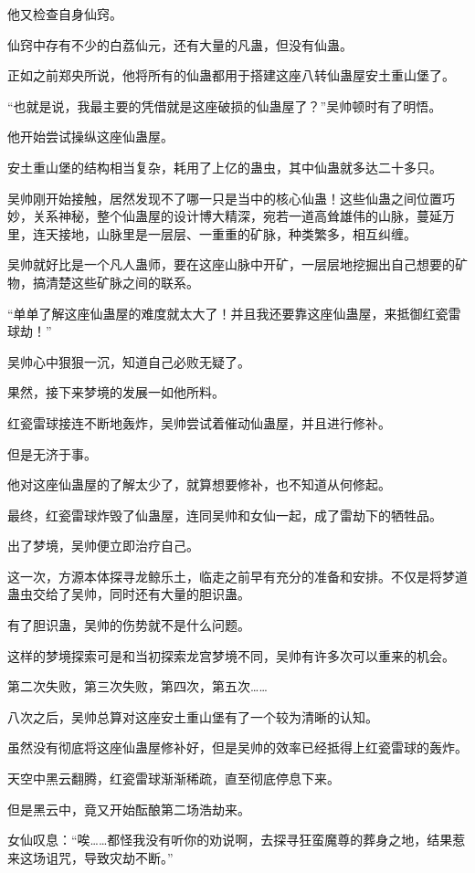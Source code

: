 \begin{this_body}
他又检查自身仙窍。

仙窍中存有不少的白荔仙元，还有大量的凡蛊，但没有仙蛊。

正如之前郑央所说，他将所有的仙蛊都用于搭建这座八转仙蛊屋安土重山堡了。

“也就是说，我最主要的凭借就是这座破损的仙蛊屋了？”吴帅顿时有了明悟。

他开始尝试操纵这座仙蛊屋。

安土重山堡的结构相当复杂，耗用了上亿的蛊虫，其中仙蛊就多达二十多只。

吴帅刚开始接触，居然发现不了哪一只是当中的核心仙蛊！这些仙蛊之间位置巧妙，关系神秘，整个仙蛊屋的设计博大精深，宛若一道高耸雄伟的山脉，蔓延万里，连天接地，山脉里是一层层、一重重的矿脉，种类繁多，相互纠缠。

吴帅就好比是一个凡人蛊师，要在这座山脉中开矿，一层层地挖掘出自己想要的矿物，搞清楚这些矿脉之间的联系。

“单单了解这座仙蛊屋的难度就太大了！并且我还要靠这座仙蛊屋，来抵御红瓷雷球劫！”

吴帅心中狠狠一沉，知道自己必败无疑了。

果然，接下来梦境的发展一如他所料。

红瓷雷球接连不断地轰炸，吴帅尝试着催动仙蛊屋，并且进行修补。

但是无济于事。

他对这座仙蛊屋的了解太少了，就算想要修补，也不知道从何修起。

最终，红瓷雷球炸毁了仙蛊屋，连同吴帅和女仙一起，成了雷劫下的牺牲品。

出了梦境，吴帅便立即治疗自己。

这一次，方源本体探寻龙鲸乐土，临走之前早有充分的准备和安排。不仅是将梦道蛊虫交给了吴帅，同时还有大量的胆识蛊。

有了胆识蛊，吴帅的伤势就不是什么问题。

这样的梦境探索可是和当初探索龙宫梦境不同，吴帅有许多次可以重来的机会。

第二次失败，第三次失败，第四次，第五次……

八次之后，吴帅总算对这座安土重山堡有了一个较为清晰的认知。

虽然没有彻底将这座仙蛊屋修补好，但是吴帅的效率已经抵得上红瓷雷球的轰炸。

天空中黑云翻腾，红瓷雷球渐渐稀疏，直至彻底停息下来。

但是黑云中，竟又开始酝酿第二场浩劫来。

女仙叹息：“唉……都怪我没有听你的劝说啊，去探寻狂蛮魔尊的葬身之地，结果惹来这场诅咒，导致灾劫不断。”


\end{this_body}
